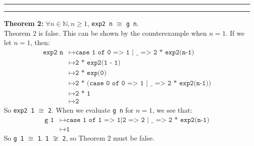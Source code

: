 \documentclass[11pt]{article}
\newcounter{questionCounter}
\newcounter{partCounter}[questionCounter]
\newenvironment{question}[2][\arabic{questionCounter}]{%
    \setcounter{partCounter}{0}%
    \vspace{.25in} \hrule \vspace{0.5em}%
        \noindent{\bf #2}%
    \vspace{0.8em} \hrule \vspace{.10in}%
    \addtocounter{questionCounter}{1}%
}{}
\begin{document}
\newpage

\begin{question}{Task 4.2}
\textbf{Theorem 2:} $\forall n \in \mathbb{N}, n \geq 1$, \verb!exp2 n! $\cong$ \verb!g n!.\\
Theorem 2 is false. This can be shown by the counterexample when $n = 1$. If we let $n = 1$, then:\\
\begin{equation*}
\begin{split}
    \texttt{exp2 n} & \mapsto \texttt{case 1 of 0 => 1 | \char`_ => 2 * exp2(n-1)}\\
                    & \mapsto \texttt{2 * exp2(1 - 1)}\\
                    & \mapsto \texttt{2 * exp(0)}\\
                    & \mapsto \texttt{2 * (case 0 of 0 => 1 | \char`_ => 2 * exp2(n-1))}\\
                    & \mapsto \texttt{2 * 1}\\
                    & \mapsto \texttt{2}
\end{split}
\end{equation*}
So \verb!exp2 1! $\cong$ \verb!2!. When we evaluate \verb!g n! for $n = 1$, we see that:
\begin{equation*}
\begin{split}
    \texttt{g 1} & \mapsto \texttt{case 1 of 1 => 1|2 => 2 | \char`_ => 2 * exp2(n-1)}\\
                    & \mapsto \texttt{1}
\end{split}
\end{equation*}
So \verb!g 1! $\cong$ \verb!1!. \verb!1! $\not\cong$ \verb!2!, so Theorem 2 must be false.
\end{question}
\end{document}
